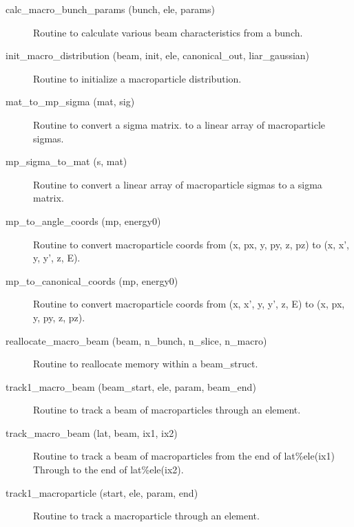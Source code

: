 \begin{description}

\label{r:calc.macro.bunch.params}
\item[calc_macro_bunch_params (bunch, ele, params)] \Newline
Routine to calculate various beam characteristics from a bunch.

\label{r:init.macro.distribution}
\item[init_macro_distribution (beam, init, ele, canonical_out, liar_gaussian)] \Newline 
Routine to initialize a macroparticle distribution.

\label{r:mat.to.mp.sigma}
\item[mat_to_mp_sigma (mat, sig)] \Newline 
Routine to convert a sigma matrix. to a linear array of 
macroparticle sigmas.

\label{r:mp.sigma.to.mat}
\item[mp_sigma_to_mat (s, mat)] \Newline 
Routine to convert a linear array of macroparticle sigmas to a 
sigma matrix. 

\label{r:mp.to.angle.coords}
\item[mp_to_angle_coords (mp, energy0)] \Newline 
Routine to convert macroparticle coords from 
(x, px, y, py, z, pz) to (x, x', y, y', z, E).

\label{r:mp.to.canonical.coords}
\item[mp_to_canonical_coords (mp, energy0)] \Newline 
Routine to convert macroparticle coords from 
(x, x', y, y', z, E) to (x, px, y, py, z, pz).

\label{r:reallocate.macro.beam}
\item[reallocate_macro_beam (beam, n_bunch, n_slice, n_macro)] \Newline 
Routine to reallocate memory within a beam_struct.

\label{r:track1.macro.beam}
\item[track1_macro_beam (beam_start, ele, param, beam_end)] \Newline
Routine to track a beam of macroparticles through an element.

\label{r:track.macro.beam}
\item[track_macro_beam (lat, beam, ix1, ix2)] \Newline 
Routine to track a beam of macroparticles from the end of
lat\%ele(ix1) Through to the end of lat\%ele(ix2).

\label{r:track1.macroparticle}
\item[track1_macroparticle (start, ele, param, end)] \Newline 
Routine to track a macroparticle through an element.

\end{description}

